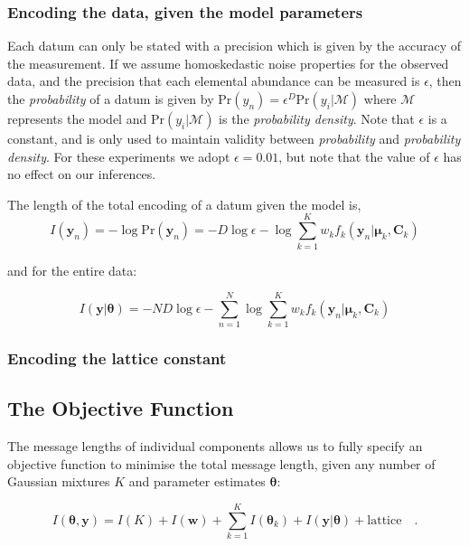 \documentclass{aastex61}
\newcommand{\vect}[1]{\boldsymbol{\mathbf{#1}}}
\def\veccov{\vect{C}}
\def\vecmean{\vect{\mu}}
\def\vectheta{\vect{\theta}}
\def\weight{w}
\def\weights{\vect{\weight}}
\def\datum{y}
\def\data{\vect{\datum}}
\begin{document}
\subsubsection{Encoding the data, given the model parameters}
\label{sec:encoding-data}


Each datum can only be stated with a precision which is given by the accuracy
of the measurement.
If we assume homoskedastic noise properties for the observed data, and the
precision that each elemental abundance can be measured is $\epsilon$, then
the \emph{probability} of a datum is given by 
$\textrm{Pr}(\datum_n) = \epsilon^D\textrm{Pr}(\datum_i|\mathcal{M})$
where $\mathcal{M}$ represents the model and $\textrm{Pr}(\datum_i|\mathcal{M})$
is the \emph{probability density}.
Note that $\epsilon$ is a constant, and is only used to maintain validity 
between \emph{probability} and \emph{probability density}.
For these experiments we adopt $\epsilon = 0.01$, but note that the value of
$\epsilon$ has no effect on our inferences.

The length of the total encoding of a datum given the model is,
\begin{equation}
  I(\data_n) = -\log{\textrm{Pr}(\data_n)} = -D\log\epsilon - \log\sum_{k=1}^{K}w_{k}f_{k}(\data_n|\vecmean_k,\veccov_k)
\end{equation}

\noindent{}and for the entire data:

\begin{equation}
  I(\data|\vectheta) = -ND\log\epsilon - \sum_{n=1}^{N}\log\sum_{k=1}^{K}w_{k}f_k(\data_n|\vecmean_k,\veccov_k)
\end{equation}


\subsubsection{Encoding the lattice constant}



\subsection{The Objective Function}
\label{sec:objective-function}


The message lengths of individual components allows us to fully specify an
objective function to minimise the total message length, given any number of
Gaussian mixtures $K$ and parameter estimates $\vectheta$:

\begin{equation}
  I(\vectheta,\data) = I(K) + I(\weights) + \sum_{k=1}^{K}I(\vectheta_k) + I(\data|\vectheta) + \textrm{lattice} \quad .
\end{equation}
\end{document}
